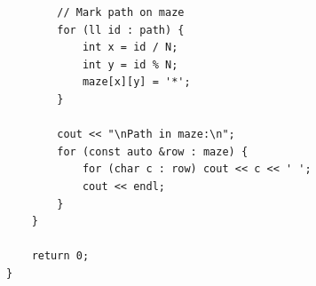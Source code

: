 \documentclass[a4paper,12pt]{article}
\begin{document}
\begin{tcolorbox}[breakable, enhanced, colback=white, title={Complete Version}, colframe=gray!40]
\begin{lstlisting}
        // Mark path on maze
        for (ll id : path) {
            int x = id / N;
            int y = id % N;
            maze[x][y] = '*';
        }

        cout << "\nPath in maze:\n";
        for (const auto &row : maze) {
            for (char c : row) cout << c << ' ';
            cout << endl;
        }
    }

    return 0;
}

\end{lstlisting}
\end{tcolorbox}

\printbibliography[title=References]
\end{document}
